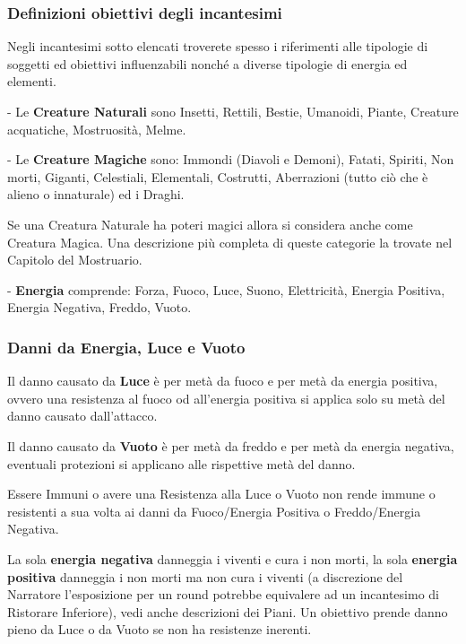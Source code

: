 \begin{multicols}{2}
\subsubsection{Definizioni obiettivi degli incantesimi}\label{magiedefinizioniobiettivi}

Negli incantesimi sotto elencati troverete spesso i riferimenti alle tipologie di soggetti ed obiettivi influenzabili nonché a diverse tipologie di energia ed elementi.

- Le \textbf{Creature Naturali} sono Insetti, Rettili, Bestie, Umanoidi, Piante, Creature acquatiche, Mostruosità, Melme.

- Le \textbf{Creature Magiche} sono: Immondi (Diavoli e Demoni), Fatati, Spiriti, Non morti, Giganti, Celestiali, Elementali, Costrutti, Aberrazioni (tutto ciò che è alieno o innaturale) ed i Draghi.

Se una Creatura Naturale ha poteri magici allora si considera anche come Creatura Magica. Una descrizione più completa di queste categorie la trovate nel Capitolo del Mostruario.

- \textbf{Energia} comprende: Forza, Fuoco, Luce, Suono, Elettricità, Energia Positiva, Energia Negativa, Freddo, Vuoto.\label{elencoenergia}\hypertarget{elencoenergia}{}

\subsubsection{Danni da Energia, Luce e Vuoto}

Il danno causato da \textbf{Luce} è per metà da fuoco e per metà da energia positiva, ovvero una resistenza al fuoco od all'energia positiva si applica solo su metà del danno causato dall'attacco. 

Il danno causato da \textbf{Vuoto} è per metà da freddo e per metà da energia negativa, eventuali protezioni si applicano alle rispettive metà del danno.

Essere Immuni o avere una Resistenza alla Luce o Vuoto non rende immune o resistenti a sua volta ai danni da Fuoco/Energia Positiva o Freddo/Energia Negativa.

La sola \textbf{energia negativa} danneggia i viventi e cura i non morti, la sola \textbf{energia positiva} danneggia i non morti ma non cura i viventi (a discrezione del Narratore l'esposizione per un round potrebbe equivalere ad un incantesimo di Ristorare Inferiore), vedi anche descrizioni dei Piani. Un obiettivo prende danno pieno da Luce o da Vuoto se non ha resistenze inerenti.


\end{multicols}
